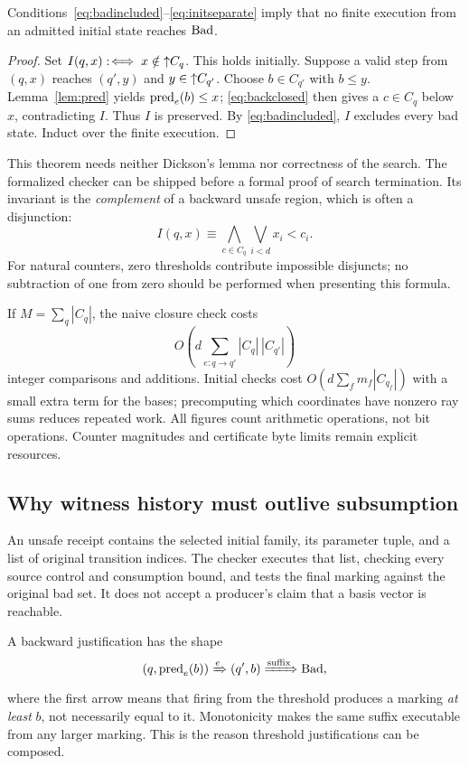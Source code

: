 \begin{theorem}
\label{thm:countersound}
Conditions~\eqref{eq:badincluded}--\eqref{eq:initseparate} imply that no finite
execution from an admitted initial state reaches $\operatorname{Bad}$.
\end{theorem}
\begin{proof}
Set $I(q,x):\!\iff x\notin\mathord{\uparrow}C_q$. This holds initially. Suppose a valid step
from $(q,x)$ reaches $(q',y)$ and $y\in\mathord{\uparrow}C_{q'}$. Choose $b\in C_{q'}$
with $b\le y$. Lemma~\ref{lem:pred} yields $\operatorname{pred}_e(b)\le x$;
\eqref{eq:backclosed} then gives a $c\in C_q$ below $x$, contradicting $I$.
Thus $I$ is preserved. By \eqref{eq:badincluded}, $I$ excludes every bad state.
Induct over the finite execution.
\end{proof}

This theorem needs neither Dickson's lemma nor correctness of the search.
The formalized checker can be shipped before a formal proof of search
termination. Its invariant is the \emph{complement} of a backward unsafe region,
which is often a disjunction:
\[
 I(q,x)\equiv\bigwedge_{c\in C_q}\bigvee_{i<d}x_i<c_i.
\]
For natural counters, zero thresholds contribute impossible disjuncts; no
subtraction of one from zero should be performed when presenting this formula.

If $M=\sum_q|C_q|$, the naive closure check costs
\[
 O\!\left(d\sum_{e:q\to q'}|C_q|\,|C_{q'}|\right)
\]
integer comparisons and additions. Initial checks cost
$O(d\sum_f m_f|C_{q_f}|)$ with a small extra term for the bases; precomputing
which coordinates have nonzero ray sums reduces repeated work. All figures
count arithmetic operations, not bit operations. Counter magnitudes and
certificate byte limits remain explicit resources.

\subsection{Why witness history must outlive subsumption}
An unsafe receipt contains the selected initial family, its parameter tuple,
and a list of original transition indices. The checker executes that list,
checking every source control and consumption bound, and tests the final
marking against the original bad set. It does not accept a producer's claim
that a basis vector is reachable.

A backward justification has the shape
\[
 (q,\operatorname{pred}_e(b))\xRightarrow{e}(q',b)\xRightarrow{\text{suffix}}\operatorname{Bad},
\]
where the first arrow means that firing from the threshold produces a marking
\emph{at least} $b$, not necessarily equal to it. Monotonicity makes the same
suffix executable from any larger marking. This is the reason threshold
justifications can be composed.

